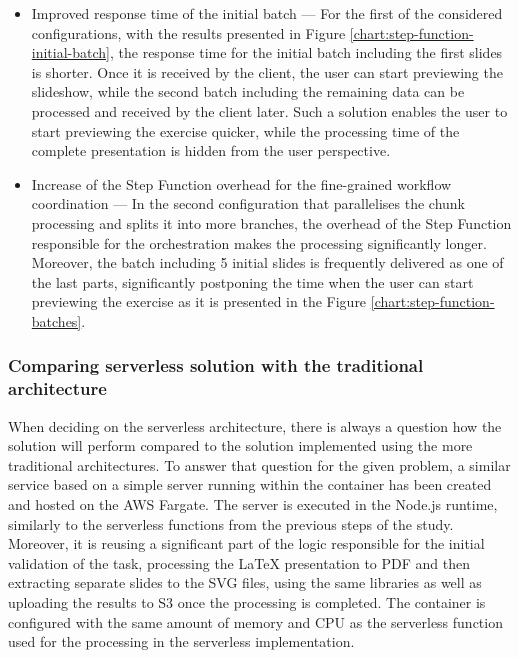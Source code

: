 \begin{itemize}
   \item Improved response time of the initial batch --- For the first of the considered configurations, with the results presented in Figure \ref{chart:step-function-initial-batch}, the response time for the initial batch including the first slides is shorter.
   Once it is received by the client, the user can start previewing the slideshow, while the second batch including the remaining data can be processed and received by the client later.
   Such a solution enables the user to start previewing the exercise quicker, while the processing time of the complete presentation is hidden from the user perspective.
   \item Increase of the Step Function overhead for the fine-grained workflow coordination --- In the second configuration that parallelises the chunk processing and splits it into more branches, the overhead of the Step Function responsible for the orchestration makes the processing significantly longer.
   Moreover, the batch including 5 initial slides is frequently delivered as one of the last parts, significantly postponing the time when the user can start previewing the exercise as it is presented in the Figure \ref{chart:step-function-batches}.
\end{itemize}

\subsubsection{Comparing serverless solution with the traditional architecture}

When deciding on the serverless architecture, there is always a question how the solution will perform compared to the solution implemented using the more traditional architectures.
To answer that question for the given problem, a similar service based on a simple server running within the container has been created and hosted on the AWS Fargate. 
The server is executed in the Node.js runtime, similarly to the serverless functions from the previous steps of the study.
Moreover, it is reusing a significant part of the logic responsible for the initial validation of the task, processing the LaTeX presentation to PDF and then extracting separate slides to the SVG files, using the same libraries as well as uploading the results to S3 once the processing is completed.
The container is configured with the same amount of memory and CPU as the serverless function used for the processing in the serverless implementation.

